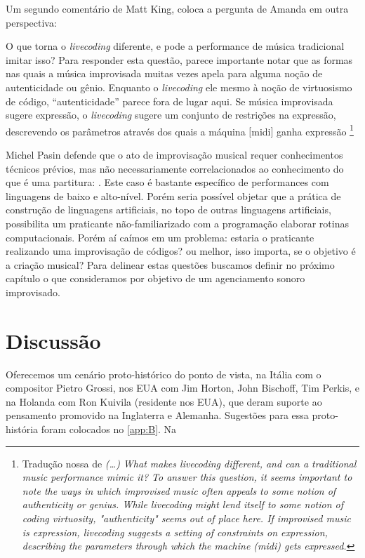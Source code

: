 Um segundo comentário de Matt King, coloca a pergunta de Amanda em outra perspectiva:

\begin{citacao}
O que torna o \emph{livecoding} diferente, e pode a performance de música tradicional imitar isso? Para responder esta questão, parece importante notar que as formas nas quais a música improvisada muitas vezes apela para alguma noção de autenticidade ou gênio. Enquanto o \emph{livecoding} ele mesmo à noção de virtuosismo de código, ``autenticidade'' parece fora de lugar aqui. Se música improvisada sugere expressão, o \emph{livecoding} sugere um conjunto de restrições na expressão, descrevendo os parâmetros através dos quais a máquina $[$midi$]$ ganha expressão \footnote{Tradução nossa de \emph{(\ldots) What makes livecoding different, and can a traditional music performance mimic it? To answer this question, it seems important to note the ways in which improvised music often appeals to some notion of authenticity or genius. While livecoding might lend itself to some notion of coding virtuosity, "authenticity" seems out of place here. If improvised music is expression, livecoding suggests a setting of constraints on expression, describing the parameters through which the machine (midi) gets expressed.}}
\end{citacao}

Michel Pasin defende que o ato de improvisação musical requer conhecimentos técnicos prévios, mas não necessariamente correlacionados ao conhecimento do que é uma partitura: . Este caso é bastante específico de performances com linguagens de baixo e alto-nível. Porém seria possível objetar que a prática de construção de linguagens artificiais, no topo de outras linguagens artificiais, possibilita um praticante não-familiarizado com a programação elaborar rotinas computacionais.  Porém aí caímos em um problema: estaria o praticante realizando uma improvisação de códigos? ou melhor, isso importa, se o objetivo é a criação musical? Para delinear estas questões buscamos definir no próximo capítulo o que consideramos por objetivo de um agenciamento sonoro improvisado.

\section{Discussão}

Oferecemos um cenário proto-histórico do ponto de vista, na Itália com o compositor Pietro Grossi, nos EUA com Jim Horton, John Bischoff, Tim Perkis, e na Holanda com Ron Kuivila (residente nos EUA), que deram suporte ao pensamento promovido na Inglaterra e Alemanha. Sugestões para essa proto-história foram colocados no \autoref{app:B}. Na 